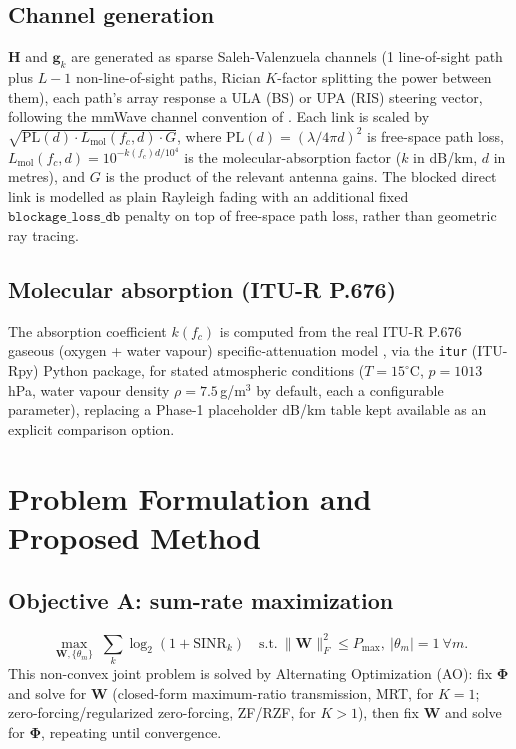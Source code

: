 \documentclass[conference]{IEEEtran}
\newcommand{\IRS}{RIS}
\begin{document}
\subsection{Channel generation}
$\mathbf{H}$ and $\mathbf{g}_k$ are generated as sparse
Saleh-Valenzuela channels (1 line-of-sight path plus $L-1$ non-line-of-sight
paths, Rician $K$-factor splitting the power between them), each path's
array response a ULA (BS) or UPA (\IRS{}) steering vector, following the
mmWave channel convention of \cite{elayach2014sparse}. Each link is
scaled by $\sqrt{\mathrm{PL}(d)\cdot L_{\mathrm{mol}}(f_c,d)\cdot G}$,
where $\mathrm{PL}(d)=(\lambda/4\pi d)^2$ is free-space path loss,
$L_{\mathrm{mol}}(f_c,d)=10^{-k(f_c)d/10^4}$ is the molecular-absorption
factor ($k$ in dB/km, $d$ in metres), and $G$ is the product of the
relevant antenna gains. The blocked direct link is modelled as plain
Rayleigh fading with an additional fixed $\texttt{blockage\_loss\_db}$
penalty on top of free-space path loss, rather than geometric ray
tracing.

\subsection{Molecular absorption (ITU-R P.676)}
The absorption coefficient $k(f_c)$ is computed from the real ITU-R
P.676 gaseous (oxygen + water vapour) specific-attenuation model
\cite{itu676}, via the \texttt{itur} (ITU-Rpy) Python package, for
stated atmospheric conditions ($T=15^{\circ}$C, $p=1013$\,hPa, water
vapour density $\rho=7.5$\,g/m$^3$ by default, each a configurable
parameter), replacing a Phase-1 placeholder dB/km table kept available
as an explicit comparison option.

\section{Problem Formulation and Proposed Method}
\label{sec:method}

\subsection{Objective A: sum-rate maximization}
\begin{equation}
\max_{\mathbf{W},\{\theta_m\}} \; \sum_k \log_2(1+\mathrm{SINR}_k)
\quad \text{s.t.}\ \|\mathbf{W}\|_F^2 \le P_{\max},\ |\theta_m|=1\ \forall m.
\label{eq:objA}
\end{equation}
This non-convex joint problem is solved by Alternating Optimization
(AO): fix $\mathbf{\Phi}$ and solve for $\mathbf{W}$ (closed-form
maximum-ratio transmission, MRT, for $K{=}1$; zero-forcing/regularized
zero-forcing, ZF/RZF, for $K{>}1$), then fix $\mathbf{W}$ and solve for
$\mathbf{\Phi}$, repeating until convergence.
\end{document}
